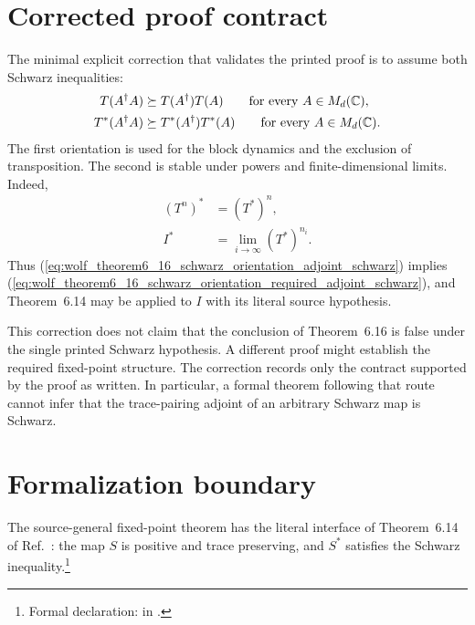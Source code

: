 \documentclass{article}
\begin{document}
\section{Corrected proof contract}

The minimal explicit correction that validates the printed proof is to assume
both Schwarz inequalities:
\begin{align}
  T(A^\dagger A)
    &\succeq T(A^\dagger)T(A)
    \qquad\text{for every }A\in M_{d}(\mathbb{C}),
  \label{eq:wolf_theorem6_16_schwarz_orientation_map_schwarz}\\
  T^*(A^\dagger A)
    &\succeq T^*(A^\dagger)T^*(A)
    \qquad\text{for every }A\in M_{d}(\mathbb{C}).
  \label{eq:wolf_theorem6_16_schwarz_orientation_adjoint_schwarz}
\end{align}
The first orientation is used for the block dynamics and the exclusion of
transposition. The second is stable under powers and finite-dimensional
limits. Indeed,
\begin{align}
  (T^n)^*
    &=(T^*)^n,
  \label{eq:wolf_theorem6_16_schwarz_orientation_adjoint_power}\\
  I^*
    &=\lim_{i\to\infty}(T^*)^{n_i}.
  \label{eq:wolf_theorem6_16_schwarz_orientation_adjoint_limit}
\end{align}
Thus
(\ref{eq:wolf_theorem6_16_schwarz_orientation_adjoint_schwarz}) implies
(\ref{eq:wolf_theorem6_16_schwarz_orientation_required_adjoint_schwarz}), and
Theorem~6.14 may be applied to $I$ with its literal source hypothesis.

This correction does not claim that the conclusion of Theorem~6.16 is false
under the single printed Schwarz hypothesis. A different proof might establish
the required fixed-point structure. The correction records only the contract
supported by the proof as written. In particular, a formal theorem following
that route cannot infer that the trace-pairing adjoint of an arbitrary Schwarz
map is Schwarz.

\section{Formalization boundary}

The source-general fixed-point theorem has the literal interface of
Theorem~6.14 of Ref.~\cite{Wolf2012Quantum}: the map $S$ is positive and trace
preserving, and $S^*$ satisfies the Schwarz inequality.\footnote{Formal
declaration:
 in
.}
\end{document}
